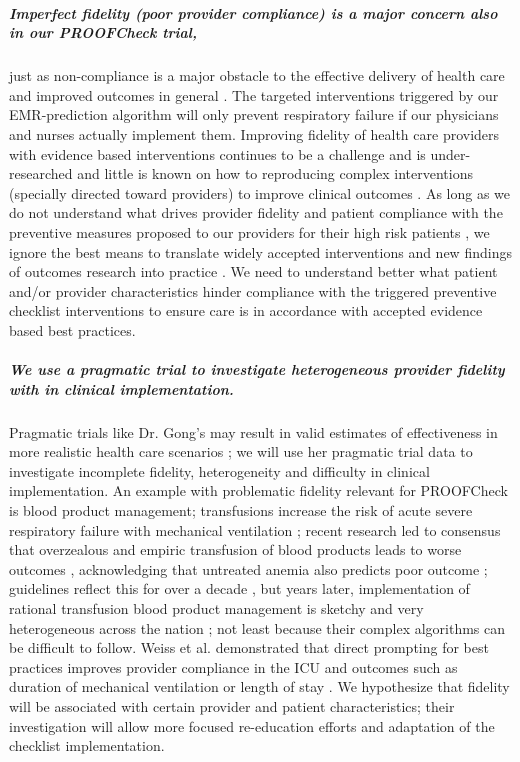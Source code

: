 \documentclass[11pt,notitlepage]{article}
\begin{document}
\subparagraph*{Imperfect fidelity (poor provider compliance) is a major concern also in our PROOFCheck trial,} just as non-compliance is a major obstacle to the effective delivery of health care and improved outcomes in general
\cite{Duncan_16710766}. The targeted interventions triggered by our EMR-prediction algorithm will only prevent respiratory failure if our physicians and nurses actually implement them. Improving fidelity of health care providers with evidence based interventions continues to be a challenge and is under-researched \cite{Davis_7650822} and little is known on how to reproducing complex interventions (specially directed toward providers) to improve clinical outcomes \cite{Campbell_10987780}. As long as we do not understand what drives provider fidelity and patient compliance with the preventive measures proposed to our providers for their high risk patients  \cite{Mittman_15172904}, we ignore the best means to translate widely accepted interventions and new findings of outcomes research into practice \cite{Glasgow_17150029}. We need to understand better what patient and/or provider characteristics hinder compliance with the triggered preventive checklist interventions to ensure care is in accordance with accepted evidence based best practices.

\subparagraph*{We use a pragmatic trial to investigate heterogeneous provider fidelity with in clinical implementation.} Pragmatic trials like Dr. Gong's may result in valid estimates of effectiveness in more realistic health care scenarios \cite{Selby_22824225,Tosh_21842618}; we will use her pragmatic trial data to investigate incomplete fidelity, heterogeneity and difficulty in clinical implementation. An example with problematic fidelity relevant for PROOFCheck is blood product management; transfusions increase the risk of acute severe respiratory failure with mechanical ventilation \cite{Kenz_24892308};  recent research led to consensus that overzealous and empiric transfusion of blood products leads to worse outcomes \cite{Hebert_9971864}, acknowledging that untreated anemia also predicts poor outcome \cite{Ranucci_22698773}; guidelines reflect this for over a decade \cite{ASA_25545654}, but  years later, implementation of rational transfusion blood product management is sketchy and very heterogeneous across the nation \cite{Likosky_20488928}; not least because their complex algorithms can be difficult to follow. Weiss et al. demonstrated that direct prompting for best practices improves provider compliance in the ICU and outcomes such as duration of mechanical ventilation or length of stay \cite{Weiss_21616996}. We hypothesize that fidelity will be associated with certain provider and patient characteristics; their investigation will allow more focused re-education efforts and adaptation of the checklist implementation. 
\end{document}
